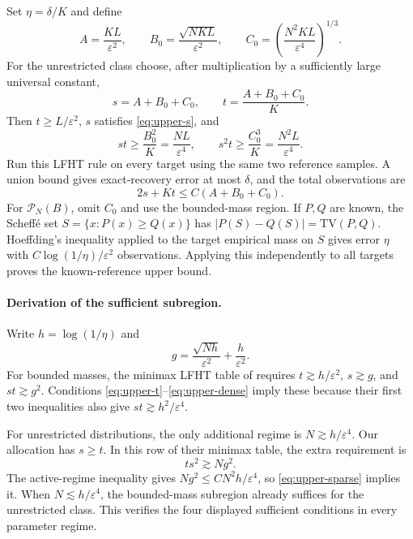 \documentclass{article}
\newcommand{\TV}{\mathrm{TV}}
\newcommand{\cP}{\mathcal P}
\begin{document}
Set $\eta=\delta/K$ and define
\[
A=\frac{KL}{\varepsilon^2},\qquad
B_0=\frac{\sqrt{NKL}}{\varepsilon^2},\qquad
C_0=\left(\frac{N^2KL}{\varepsilon^4}\right)^{1/3}.
\]
For the unrestricted class choose, after multiplication by a sufficiently large universal constant,
\[
s=A+B_0+C_0,\qquad t=\frac{A+B_0+C_0}{K}.
\]
Then $t\geq L/\varepsilon^2$, $s$ satisfies \eqref{eq:upper-s}, and
\[
st\geq\frac{B_0^2}{K}=\frac{NL}{\varepsilon^4},\qquad
s^2t\geq\frac{C_0^3}{K}=\frac{N^2L}{\varepsilon^4}.
\]
Run this LFHT rule on every target using the same two reference samples. A union bound gives exact-recovery error at most $\delta$, and the total observations are
\[
2s+Kt\leq C(A+B_0+C_0).
\]
For $\cP_N(B)$, omit $C_0$ and use the bounded-mass region. If $P,Q$ are known, the Scheff\'e set $S=\{x:P(x)\geq Q(x)\}$ has $|P(S)-Q(S)|=\TV(P,Q)$. Hoeffding's inequality applied to the target empirical mass on $S$ gives error $\eta$ with $C\log(1/\eta)/\varepsilon^2$ observations. Applying this independently to all targets proves the known-reference upper bound.

\paragraph{Derivation of the sufficient subregion.}
Write $h=\log(1/\eta)$ and
\[
g=\frac{\sqrt{Nh}}{\varepsilon^2}+\frac{h}{\varepsilon^2}.
\]
For bounded masses, the minimax LFHT table of \citet{gerber2023classification} requires $t\gtrsim h/\varepsilon^2$, $s\gtrsim g$, and $st\gtrsim g^2$. Conditions \eqref{eq:upper-t}--\eqref{eq:upper-dense} imply these because their first two inequalities also give $st\gtrsim h^2/\varepsilon^4$.

For unrestricted distributions, the only additional regime is $N\gtrsim h/\varepsilon^4$. Our allocation has $s\geq t$. In this row of their minimax table, the extra requirement is
\[
ts^2\gtrsim Ng^2.
\]
The active-regime inequality gives $Ng^2\leq C N^2h/\varepsilon^4$, so \eqref{eq:upper-sparse} implies it. When $N\lesssim h/\varepsilon^4$, the bounded-mass subregion already suffices for the unrestricted class. This verifies the four displayed sufficient conditions in every parameter regime.


\end{document}
